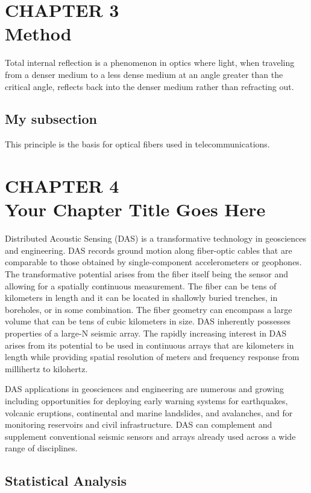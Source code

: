 \documentclass[12pt]{article}
\begin{document}
\newpage
\section*{CHAPTER 3\\ Method }

Total internal reflection is a phenomenon in optics where light, when traveling from a denser medium to a less dense medium at an angle greater than the critical angle, reflects back into the denser medium rather than refracting out. 

\subsection*{My subsection}

This principle is the basis for optical fibers used in telecommunications.

\newpage
\section*{CHAPTER 4\\Your Chapter Title Goes Here }

Distributed Acoustic Sensing (DAS) is a transformative technology in geosciences and engineering. DAS records ground motion along fiber-optic cables that are comparable to those obtained by single-component accelerometers or geophones. The transformative potential arises from the fiber itself being the sensor and allowing for a spatially continuous measurement. The fiber can be tens of kilometers in length and it can be located in shallowly buried trenches, in boreholes, or in some combination. The fiber geometry can encompass a large volume that can be tens of cubic kilometers in size. DAS inherently possesses properties of a large-N seismic array. The rapidly increasing interest in DAS arises from its potential to be used in continuous arrays that are kilometers in length while providing spatial resolution of meters and frequency response from millihertz to kilohertz.

DAS applications in geosciences and engineering are numerous and growing including opportunities for deploying early warning systems for earthquakes, volcanic eruptions, continental and marine landslides, and avalanches, and for monitoring reservoirs and civil infrastructure. DAS can complement and supplement conventional seismic sensors and arrays already used across a wide range of disciplines.

\subsection*{Statistical Analysis}
\end{document}
